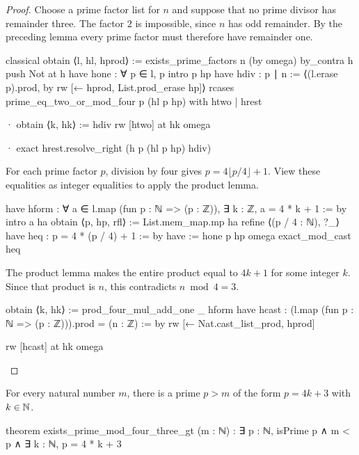 \begin{proof}
  Choose a prime factor list for $n$ and suppose that no prime divisor has remainder three.
  The factor $2$ is impossible, since $n$ has odd remainder.
  By the preceding lemma every prime factor must therefore have remainder one.

  \begin{lean}
    classical
    obtain ⟨l, hl, hprod⟩ := exists_prime_factors n (by omega)
    by_contra h
    push Not at h
    have hone : ∀ p ∈ l, p %
      intro p hp
      have hdiv : p ∣ n := ⟨(l.erase p).prod, by rw [← hprod, List.prod_erase hp]⟩
      rcases prime_eq_two_or_mod_four p (hl p hp) with htwo | hrest

      · obtain ⟨k, hk⟩ := hdiv
        rw [htwo] at hk
        omega

      · exact hrest.resolve_right (h p (hl p hp) hdiv)
  \end{lean}

  For each prime factor $p$, division by four gives $p=4\lfloor p/4\rfloor+1$.
  View these equalities as integer equalities to apply the product lemma.

  \begin{lean}
    have hform : ∀ a ∈ l.map (fun p : ℕ => (p : ℤ)), ∃ k : ℤ, a = 4 * k + 1 := by
      intro a ha
      obtain ⟨p, hp, rfl⟩ := List.mem_map.mp ha
      refine ⟨(p / 4 : ℕ), ?_⟩
      have heq : p = 4 * (p / 4) + 1 := by
        have := hone p hp
        omega
      exact_mod_cast heq
  \end{lean}

  The product lemma makes the entire product equal to $4k+1$ for some integer $k$.
  Since that product is $n$, this contradicts $n\bmod4=3$.

  \begin{lean}
    obtain ⟨k, hk⟩ := prod_four_mul_add_one _ hform
    have hcast : (l.map (fun p : ℕ => (p : ℤ))).prod = (n : ℤ) := by
      rw [← Nat.cast_list_prod, hprod]

    rw [hcast] at hk
    omega
  \end{lean}

\end{proof}

\begin{lemma}
  \label{ent:lem:prime-four-mul-add-three-above-bound}
  For every natural number $m$, there is a prime $p>m$ of the form $p=4k+3$ with $k\in\mathbb{N}$.

  \begin{lean}
    theorem exists_prime_mod_four_three_gt (m : ℕ) :
        ∃ p : ℕ, isPrime p ∧ m < p ∧ ∃ k : ℕ, p = 4 * k + 3
  \end{lean}
\end{lemma}


